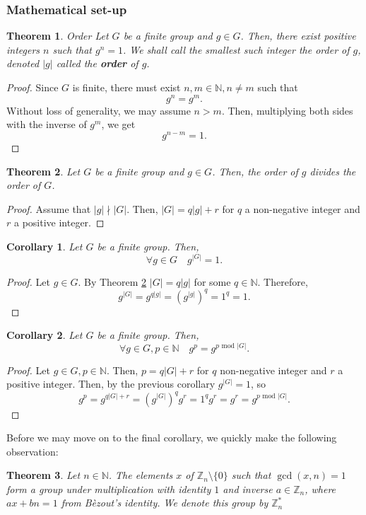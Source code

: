 \documentclass{article}
\newtheorem{theorem}{Theorem}[section]
\newtheorem{corollary}{Corollary}[theorem]
\theoremstyle{definition}
\theoremstyle{example}
\newcommand{\Int}{\mathbb{Z}}
\newcommand{\Nat}{\mathbb{N}}
\renewcommand{\mod}{\,\,\text{mod}\,\,}
\begin{document}
\subsubsection{Mathematical set-up}
\begin{theorem}{Order}
  Let $G$ be a finite group and $g \in G$. Then, there exist positive integers
  $n$ such that $g^n = 1$. We shall call the smallest such integer the order of
  $g$, denoted $|g|$ called the \textbf{order} of $g$.
\end{theorem}
\begin{proof}
  Since $G$ is finite, there must exist $n, m \in \Nat, n \neq m$ such that
  \[
    g^n = g^m.
  \]
  Without loss of generality, we may assume $n > m$. Then, multiplying both
  sides with the inverse of $g^m$, we get
  \[
    g^{n - m } = 1.
  \]
\end{proof}
\begin{theorem}
  \label{thm:elemorderdiv}
  Let $G$ be a finite group and $g \in G$. Then, the order of $g$ divides the
  order of $G$.
\end{theorem}
\begin{proof}
  Assume that $|g| \nmid |G|$. Then, $|G| = q|g| + r$ for $q$ a non-negative
  integer and $r$ a positive integer.
\end{proof}
\begin{corollary}
  \label{cor:elemgroupordpow}
  Let $G$ be a finite group. Then,
  \[
    \forall g \in G\quad g^{|G|} = 1.
  \]
\end{corollary}
\begin{proof}
  Let $g \in G$. By Theorem \ref{thm:elemorderdiv} $|G| = q|g|$ for some $q \in
  \Nat$. Therefore,
  \[
    g^{|G|} = g^{q|g|} = (g^{|g|})^q = 1^q = 1.
  \]
\end{proof}
\begin{corollary}
  \label{thm:groupordpow}
  Let $G$ be a finite group. Then,
  \[
    \forall g \in G, p \in \Nat\quad g^p = g^{p \mod |G|}.
  \]
\end{corollary}
\begin{proof}
  \label{thm:grouppowmod}
  Let $g \in G, p \in \Nat$. Then, $p = q|G| + r$ for $q$ non-negative integer
  and $r$ a positive integer. Then, by the previous corollary $g^{|G|} = 1$, so
  \[
    g^p = g^{q|G| + r} = (g^{|G|})^qg^r = 1^qg^r= g^r = g^{p \mod |G|}.
  \]
\end{proof}
Before we may move on to the final corollary, we quickly make the following
observation:
\begin{theorem}
  Let $n \in \Nat$. The elements $x$ of $\Int_n \setminus \{0\}$ such that $\gcd(x, n) = 1$ form
  a group under multiplication with identity $1$ and inverse $a \in \Int_n$,
  where $ax + bn = 1$ from B\`ezout's identity. We denote this group by $\Int^*_n$
\end{theorem}
\end{document}
